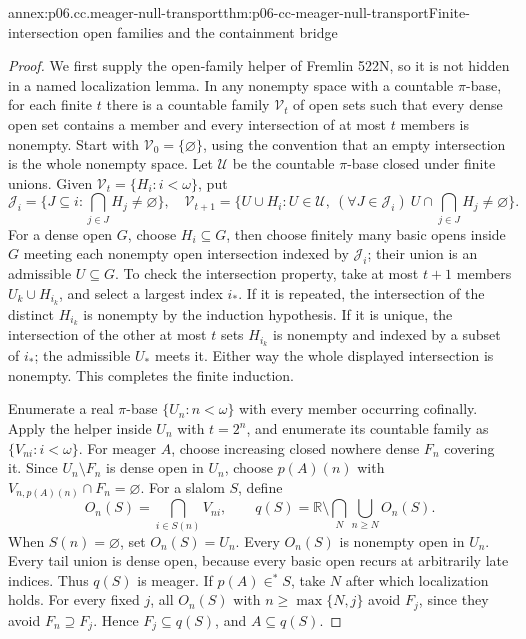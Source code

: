 \begin{annexitem}{annex:p06.cc.meager-null-transport}{thm:p06-cc-meager-null-transport}{Finite-intersection open families and the containment bridge}
\begin{proof}
We first supply the open-family helper of Fremlin 522N, so it is not
hidden in a named localization lemma. In any nonempty space with a
countable \(\pi\)-base, for each finite \(t\) there is a countable
family \(\mathcal V_t\) of open sets such that every dense open set
contains a member and every intersection of at most \(t\) members
is nonempty. Start with \(\mathcal V_0=\{\varnothing\}\), using
the convention that an empty intersection is the whole nonempty space.
Let \(\mathcal U\) be the countable \(\pi\)-base closed under finite
unions. Given \(\mathcal V_t=\{H_i:i<\omega\}\), put
\[
 \mathcal J_i=\{J\subseteq i:\bigcap_{j\in J}H_j\ne\varnothing\},
\quad
 \mathcal V_{t+1}=\{U\cup H_i:U\in\mathcal U,
       \ (\forall J\in\mathcal J_i)\ U\cap\bigcap_{j\in J}H_j\ne\varnothing\}.
\]
For a dense open \(G\), choose \(H_i\subseteq G\), then choose
finitely many basic opens inside \(G\) meeting each nonempty open
intersection indexed by \(\mathcal J_i\); their union is an admissible
\(U\subseteq G\). To check the intersection property, take at most
\(t+1\) members \(U_k\cup H_{i_k}\), and select a largest index
\(i_*\). If it is repeated, the intersection of the distinct
\(H_{i_k}\) is nonempty by the induction hypothesis. If it is unique,
the intersection of the other at most \(t\) sets \(H_{i_k}\) is
nonempty and indexed by a subset of \(i_*\); the admissible
\(U_*\) meets it. Either way the whole displayed intersection is
nonempty. This completes the finite induction.

Enumerate a real \(\pi\)-base \(\{U_n:n<\omega\}\) with every
member occurring cofinally. Apply the helper inside \(U_n\) with
\(t=2^n\), and enumerate its countable family as
\(\{V_{ni}:i<\omega\}\). For meager \(A\), choose increasing
closed nowhere dense \(F_n\) covering it. Since \(U_n\setminus F_n\)
is dense open in \(U_n\), choose \(p(A)(n)\) with
\(V_{n,p(A)(n)}\cap F_n=\varnothing\).
For a slalom \(S\), define
\[
 O_n(S)=\bigcap_{i\in S(n)}V_{ni},\qquad
 q(S)=\mathbb R\setminus\bigcap_N\bigcup_{n\geq N}O_n(S).
\]
When \(S(n)=\varnothing\), set \(O_n(S)=U_n\).
Every \(O_n(S)\) is nonempty open in \(U_n\). Every tail union
is dense open, because every basic open recurs at arbitrarily late
indices. Thus \(q(S)\) is meager. If \(p(A)\in^*S\), take \(N\)
after which localization holds. For every fixed \(j\), all
\(O_n(S)\) with \(n\geq\max\{N,j\}\) avoid \(F_j\), since
they avoid \(F_n\supseteq F_j\). Hence \(F_j\subseteq q(S)\),
and \(A\subseteq q(S)\).


\end{proof}
\end{annexitem}
